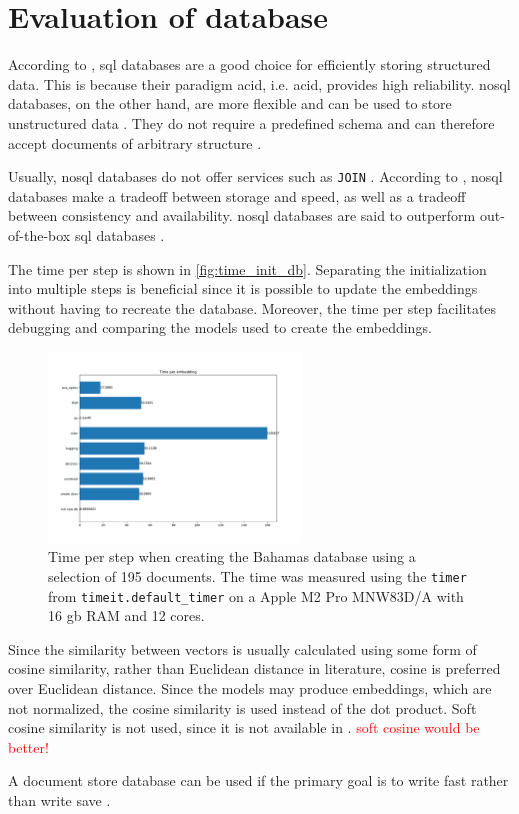 \section{Evaluation of database}\label{subsec:evaluation-db}

According to \cite{flask_book2018}, \ac{sql} databases are a good choice for efficiently storing structured data.
This is because their paradigm \acs{acid}, i.e. \acl{acid}, provides high reliability.
\ac{nosql} databases, on the other hand, are more flexible and can be used to store unstructured data \cite{flask_book2018}.
They do not require a predefined schema and can therefore accept documents of arbitrary structure \cite{flask2018}.

Usually, \ac{nosql} databases do not offer services such as \texttt{JOIN} \cite{flask2018}.
According to \citeauthor{flask2018}, \ac{nosql} databases make a tradeoff between storage and speed, as well as a tradeoff between consistency and availability.
\ac{nosql} databases are said to outperform out-of-the-box \ac{sql} databases \cite{flask2018}.

The time per step is shown in \autoref{fig:time_init_db}.
Separating the initialization into multiple steps is beneficial since it is possible to update the embeddings without having to recreate the database.
Moreover, the time per step facilitates debugging and comparing the models used to create the embeddings.

\begin{figure}[htp] %
    \centering
    \includegraphics[width=0.6\textwidth]{images/Elasticsearch/time_per_emb.pdf}
    \caption{Time per step when creating the Bahamas database using a selection of 195 documents.
    The time was measured using the \texttt{timer} from \texttt{timeit.default\_timer} on a Apple M2 Pro MNW83D/A with 16 \ac{gb} RAM and 12 cores.
    }
    \label{fig:time_init_db}
\end{figure}

Since the similarity between vectors is usually calculated using some form of cosine similarity, 
rather than Euclidean distance in literature, cosine is preferred over Euclidean distance. 
Since the models may produce embeddings, which are not normalized, the cosine similarity is used instead of the dot product.
Soft cosine similarity is not used, since it is not available in \databaseName{}.
\textcolor{red}{soft cosine would be better!}

A document store database can be used if the primary goal is to write fast rather than write save \cite{flask2018}.